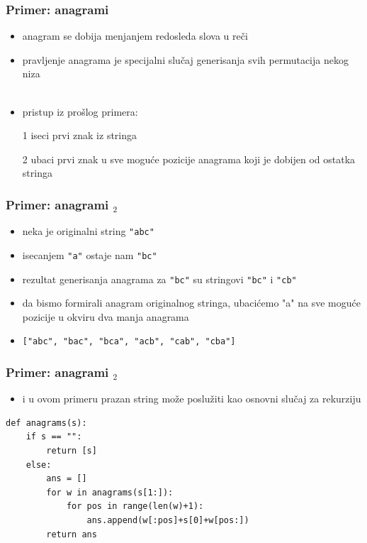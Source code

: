 \documentclass[utf8,compress]{beamer}
\begin{document}
\begin{frame}[fragile]
  \frametitle{Primer: anagrami}
  \begin{itemize}
    \item anagram se dobija menjanjem redosleda slova u reči
    \item pravljenje anagrama je specijalni slučaj generisanja svih permutacija nekog niza \\ \ \\
    \item pristup iz prošlog primera:
    \item[1] iseci prvi znak iz stringa
    \item[2] ubaci prvi znak u sve moguće pozicije anagrama koji je dobijen od ostatka stringa
  \end{itemize}
\end{frame}

\begin{frame}[fragile]
  \frametitle{Primer: anagrami $_2$}
  \begin{itemize}
    \item neka je originalni string \texttt{"abc"}
    \item isecanjem \texttt{"a"} ostaje nam \texttt{"bc"}
    \item rezultat generisanja anagrama za \texttt{"bc"} su stringovi \texttt{"bc"} i \texttt{"cb"}
    \item da bismo formirali anagram originalnog stringa, ubacićemo "a" na sve moguće pozicije u okviru dva manja anagrama
    \item \texttt{["abc", "bac", "bca", "acb", "cab", "cba"]}
  \end{itemize}
\end{frame}

\begin{frame}[fragile]
  \frametitle{Primer: anagrami $_2$}
  \begin{itemize}
    \item i u ovom primeru prazan string može poslužiti kao osnovni slučaj za rekurziju
  \end{itemize}
\begin{verbatim}
def anagrams(s):
    if s == "":
        return [s]
    else:
        ans = []
        for w in anagrams(s[1:]):
            for pos in range(len(w)+1):
                ans.append(w[:pos]+s[0]+w[pos:])
        return ans
\end{verbatim}
\end{frame}
\end{document}
